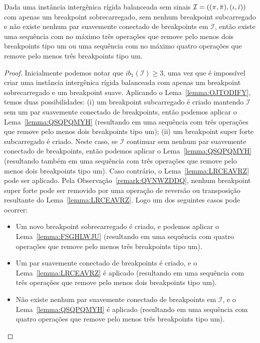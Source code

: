 \begin{lemma}\label{lemma:WGHTDURW}
Dada uma instância intergênica rígida balanceada sem sinais $\mathcal{I}=((\pi,\breve\pi),\break(\iota,\breve\iota))$ com apenas um breakpoint sobrecarregado, sem nenhum breakpoint subcarregado e não existe nenhum par suavemente conectado de breakpoints em $\mathcal{I}$, então existe uma sequência com no máximo três operações que remove pelo menos dois breakpoints tipo um ou uma sequência com no máximo quatro operações que remove pelo menos três breakpoints tipo um.
\end{lemma}
\begin{proof}
Inicialmente podemos notar que $ib_1(\mathcal{I}) \ge 3$, uma vez que é impossível criar uma instância intergênica rígida balanceada com apenas um breakpoint sobrecarregado e um breakpoint suave. Aplicando o Lema~\ref{lemma:OJTODIFY}, temos duas possibilidades: (i) um breakpoint subcarregado é criado mantendo $\mathcal{I}$ sem um par suavemente conectado de breakpoints, então podemos aplicar o Lema~\ref{lemma:QSQPQMYH} (resultando em uma sequência com três operações que remove pelo menos dois breakpoints tipo um); (ii) um breakpoint super forte subcarregado é criado. Neste caso, se $\mathcal{I}$ continuar sem nenhum par suavemente conectado de breakpoints, então podemos aplicar o Lema~\ref{lemma:QSQPQMYH} (resultando também em uma sequência com três operações que remove pelo menos dois breakpoints tipo um). Caso contrário, o Lema~\ref{lemma:LRCEAVRZ} pode ser aplicado. Pela Observação~\ref{remark:QVNWZDDQ}, nenhum breakpoint super forte pode ser removido por uma operação de reversão ou transposição resultante do Lema~\ref{lemma:LRCEAVRZ}. Logo um dos seguintes casos pode ocorrer:
\begin{itemize}
  \item Um novo breakpoint sobrecarregado é criado, e podemos aplicar o Lema~\ref{lemma:FSGHLWJU} (resultando em uma sequência com quatro operações que remove pelo menos três breakpoints tipo um).
  \item Um par suavemente conectado de breakpoints é criado, e o Lema~\ref{lemma:LRCEAVRZ} é aplicado (resultando em uma sequência com três operações que remove pelo menos dois breakpoints tipo um).
  \item Não existe nenhum par suavemente conectado de breakpoints em $\mathcal{I}$, e o Lema~\ref{lemma:QSQPQMYH} é aplicado (resultando em uma sequência com quatro operações que remove pelo menos três breakpoints tipo um).
\end{itemize}
\end{proof}

